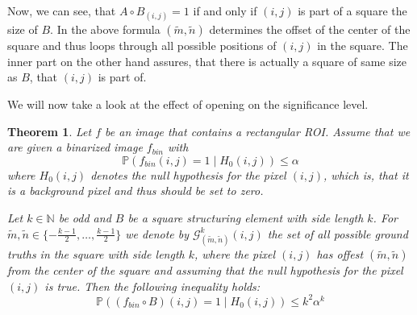 \documentclass[a4paper,12pt]{article}
\theoremstyle{plain}
\newtheorem{theorem}{Theorem}
\theoremstyle{definition}
\theoremstyle{remark}
\begin{document}
Now, we can see, that $A \circ B_{(i, j)} = 1$ if and only if $(i, j)$ is part of a square the size of $B$. In the above formula $(\tilde{m}, \tilde{n})$ determines the offset of the center of the square and thus loops through all possible positions of $(i, j)$ in the square. The inner part on the other hand assures, that there is actually a square of same size as $B$, that $(i, j)$ is part of.

We will now take a look at the effect of opening on the significance level.

\begin{theorem}
	Let $f$ be an image that contains a rectangular ROI. Assume that we are given a binarized image $f_{bin}$ with
	\begin{equation*}
	\mathbb{P}(f_{bin}(i, j) = 1 \mid H_0(i, j)) \leq \alpha
	\end{equation*}
	where $H_0(i, j)$ denotes the null hypothesis for the pixel $(i, j)$, which is, that it is a background pixel and thus should be set to zero.
	
	Let $k \in \mathbb{N}$ be odd and $B$ be a square structuring element with side length $k$. For $\tilde{m}, \tilde{n} \in \{ -\frac{k - 1}{2}, \dots, \frac{k - 1}{2} \}$ we denote by $\mathcal{G}_{(\tilde{m}, \tilde{n})}^k(i, j)$ the set of all possible ground truths in the square with side length $k$, where the pixel $(i, j)$ has offest $(\tilde{m}, \tilde{n})$ from the center of the square and assuming that the null hypothesis for the pixel $(i, j)$ is true.
	Then the following inequality holds:
	\begin{equation*}
		\mathbb{P}((f_{bin} \circ B)(i, j) = 1 \mid H_0(i, j)) \leq k^2 \alpha^k
	\end{equation*}
\end{theorem}
\end{document}

